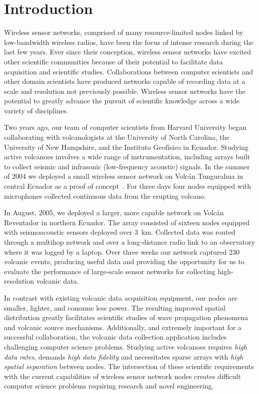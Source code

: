 \section{Introduction}

Wireless sensor networks, comprised of many resource-limited nodes linked by
low-bandwidth wireless radios, have been the focus of intense research during
the last few years.  Ever since their conception, wireless sensor networks
have excited other scientific communities because of their potential to
facilitate data acquisition and scientific studies.  Collaborations between
computer scientists and other domain scientists have produced networks
capable of recording data at a scale and resolution not previously possible.
Wireless sensor networks have the potential to greatly advance the pursuit of
scientific knowledge across a wide variety of disciplines.

Two years ago, our team of computer scientists from Harvard University began
collaborating with volcanologists at the University of North Carolina, the
University of New Hampshire, and the Instituto Geof\'{i}sico in Ecuador.
Studying active volcanoes involves a wide range of instrumentation, including
arrays built to collect seismic and infrasonic (low-frequency acoustic)
signals. In the summer of 2004 we deployed a small wireless sensor network on
Volc\'{a}n Tungurahua in central Ecuador as a proof of
concept~\cite{volcano-ewsn05}.  For three days four nodes equipped with
microphones collected continuous data from the erupting volcano.

In August, 2005, we deployed a larger, more capable network on Volc\'{a}n
Reventador in northern Ecuador.  The array consisted of sixteen nodes
equipped with seismoacoustic sensors deployed over 3~km.  Collected data was
routed through a multihop network and over a long-distance radio link to an
observatory where it was logged by a laptop.  Over three weeks our network
captured 230 volcanic events, producing useful data and providing the
opportunity for us to evaluate the performance of large-scale sensor networks
for collecting high-resolution volcanic data.

In contrast with existing volcanic data acquisition equipment, our nodes are
smaller, lighter, and consume less power.  The resulting improved spatial
distribution greatly facilitates scientific studies of wave propagation
phenomena and volcanic source mechanisms.  Additionally, and extremely
important for a successful collaboration, the volcanic data collection
application includes challenging computer science problems.  Studying active
volcanoes requires {\em high data rates}, demands {\em high data fidelity} and
necessitates sparse arrays with {\em high spatial separation} between nodes.
The intersection of these scientific requirements with the current
capabilities of wireless sensor network nodes creates difficult computer
science problems requiring research and novel engineering.  
